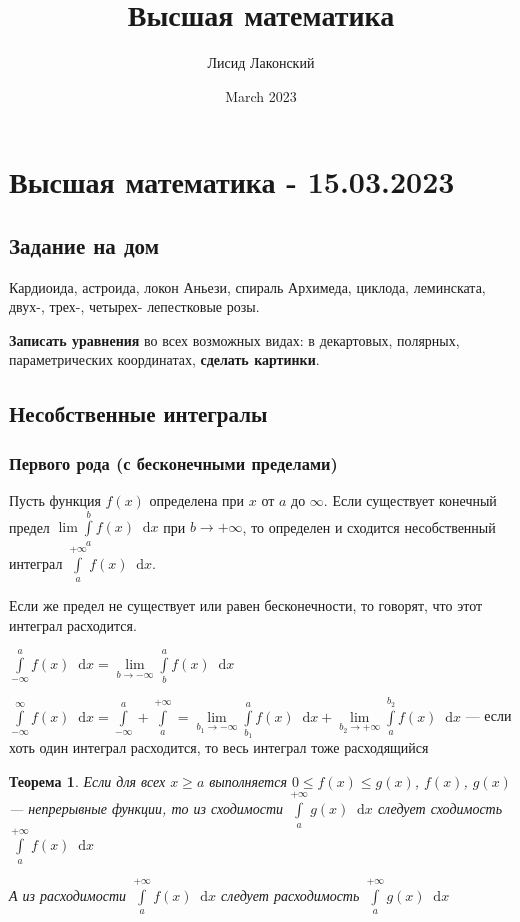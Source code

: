 \documentclass{article}
\title{Высшая математика}
\author{Лисид Лаконский}
\date{March 2023}
\newcommand*\diff{\mathop{}\!\mathrm{d}}
\newtheorem{theorem}{Теорема}
\begin{document}
\raggedright

\maketitle

\tableofcontents
\pagebreak

\section{Высшая математика - 15.03.2023}

\subsection{Задание на дом}

Кардиоида, астроида, локон Аньези, спираль Архимеда, циклода, леминската, двух-, трех-, четырех- лепестковые розы.

\textbf{Записать уравнения} во всех возможных видах: в декартовых, полярных, параметрических координатах, \textbf{сделать картинки}.

\subsection{Несобственные интегралы}

\subsubsection{Первого рода (с бесконечными пределами)}

Пусть функция $f(x)$ определена при $x$ от $a$ до $\infty$. Если существует конечный предел $\lim \int\limits_{a}^{b} f(x) \diff x$ при $b \to +\infty$, то определен и сходится несобственный интеграл $\int \limits_{a}^{+\infty} f(x) \diff x$.

Если же предел не существует или равен бесконечности, то говорят, что этот интеграл расходится.

\hfill

$\int\limits_{-\infty}^{a} f(x) \diff x = \lim\limits_{b \to -\infty} \int\limits_{b}^{a} f(x) \diff x$

$\int\limits_{-\infty}^{\infty} f(x) \diff x = \int\limits_{-\infty}^{a} + \int\limits_{a}^{+\infty} = \lim\limits_{b_1 \to -\infty} \int\limits_{b_1}^{a} f(x) \diff x + \lim\limits_{b_2 \to +\infty} \int\limits_{a}^{b_2} f(x) \diff x$ — если хоть один интеграл расходится, то весь интеграл тоже расходящийся


\begin{theorem}
    Если для всех $x \ge a$ выполняется $0 \le f(x) \le g(x)$, $f(x)$, $g(x)$ — непрерывные функции, то из сходимости $\int\limits_{a}^{+\infty} g(x) \diff x$ следует сходимость $\int\limits_{a}^{+\infty} f(x) \diff x$

    А из расходимости $\int\limits_{a}^{+\infty} f(x) \diff x$ следует расходимость $\int\limits_{a}^{+\infty} g(x) \diff x$
\end{theorem}
\end{document}
